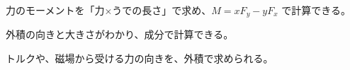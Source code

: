 \begin{furikaeri}
\begin{checklist}
\item 力のモーメントを「力×うでの長さ」で求め、$M=xF_y-yF_x$ で計算できる。
\item 外積の向きと大きさがわかり、成分で計算できる。
\item トルクや、磁場から受ける力の向きを、外積で求められる。
\end{checklist}
\end{furikaeri}

